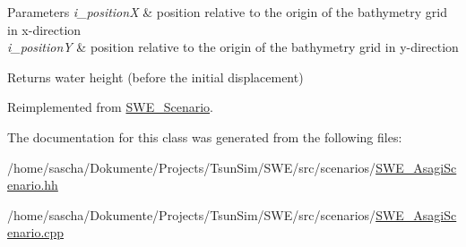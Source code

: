 \begin{DoxyParams}{Parameters}
{\em i\-\_\-position\-X} & position relative to the origin of the bathymetry grid in x-\/direction \\
\hline
{\em i\-\_\-position\-Y} & position relative to the origin of the bathymetry grid in y-\/direction \\
\hline
\end{DoxyParams}
\begin{DoxyReturn}{Returns}
water height (before the initial displacement) 
\end{DoxyReturn}


Reimplemented from \hyperlink{classSWE__Scenario}{S\-W\-E\-\_\-\-Scenario}.



The documentation for this class was generated from the following files\-:\begin{DoxyCompactItemize}
\item 
/home/sascha/\-Dokumente/\-Projects/\-Tsun\-Sim/\-S\-W\-E/src/scenarios/\hyperlink{SWE__AsagiScenario_8hh}{S\-W\-E\-\_\-\-Asagi\-Scenario.\-hh}\item 
/home/sascha/\-Dokumente/\-Projects/\-Tsun\-Sim/\-S\-W\-E/src/scenarios/\hyperlink{SWE__AsagiScenario_8cpp}{S\-W\-E\-\_\-\-Asagi\-Scenario.\-cpp}\end{DoxyCompactItemize}
